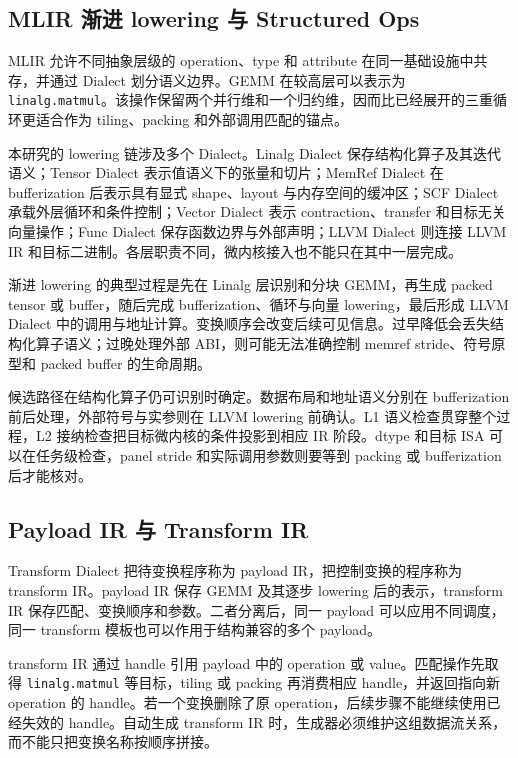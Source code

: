 \subsection{MLIR 渐进 lowering 与 Structured Ops}

MLIR 允许不同抽象层级的 operation、type 和 attribute 在同一基础设施中共存，并通过 Dialect 划分语义边界\cite{Lattner2020MLIR}。GEMM 在较高层可以表示为 \texttt{linalg.matmul}。该操作保留两个并行维和一个归约维，因而比已经展开的三重循环更适合作为 tiling、packing 和外部调用匹配的锚点。

本研究的 lowering 链涉及多个 Dialect。Linalg Dialect 保存结构化算子及其迭代语义；Tensor Dialect 表示值语义下的张量和切片；MemRef Dialect 在 bufferization 后表示具有显式 shape、layout 与内存空间的缓冲区；SCF Dialect 承载外层循环和条件控制；Vector Dialect 表示 contraction、transfer 和目标无关向量操作；Func Dialect 保存函数边界与外部声明；LLVM Dialect 则连接 LLVM IR 和目标二进制。各层职责不同，微内核接入也不能只在其中一层完成。

渐进 lowering 的典型过程是先在 Linalg 层识别和分块 GEMM，再生成 packed tensor 或 buffer，随后完成 bufferization、循环与向量 lowering，最后形成 LLVM Dialect 中的调用与地址计算。变换顺序会改变后续可见信息。过早降低会丢失结构化算子语义；过晚处理外部 ABI，则可能无法准确控制 memref stride、符号原型和 packed buffer 的生命周期。

候选路径在结构化算子仍可识别时确定。数据布局和地址语义分别在 bufferization 前后处理，外部符号与实参则在 LLVM lowering 前确认。L1 语义检查贯穿整个过程，L2 接纳检查把目标微内核的条件投影到相应 IR 阶段。dtype 和目标 ISA 可以在任务级检查，panel stride 和实际调用参数则要等到 packing 或 bufferization 后才能核对。

\subsection{Payload IR 与 Transform IR}

Transform Dialect 把待变换程序称为 payload IR，把控制变换的程序称为 transform IR\cite{LLVMProjectTransformDialect,Luecke2025TransformDialect}。payload IR 保存 GEMM 及其逐步 lowering 后的表示，transform IR 保存匹配、变换顺序和参数。二者分离后，同一 payload 可以应用不同调度，同一 transform 模板也可以作用于结构兼容的多个 payload。

transform IR 通过 handle 引用 payload 中的 operation 或 value。匹配操作先取得 \texttt{linalg.matmul} 等目标，tiling 或 packing 再消费相应 handle，并返回指向新 operation 的 handle。若一个变换删除了原 operation，后续步骤不能继续使用已经失效的 handle。自动生成 transform IR 时，生成器必须维护这组数据流关系，而不能只把变换名称按顺序拼接。

